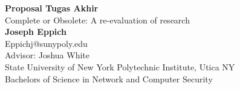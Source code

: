 \documentclass{article}
\begin{document}
	\begin{center}
    
    
		\LARGE{\textbf{Proposal Tugas Akhir}} \\
        \vspace{1em}
        \Large{Complete or Obsolete: A re-evaluation of research} \\
        \vspace{1em}
        \normalsize\textbf{Joseph Eppich} \\
        \normalsize{Eppichj@sunypoly.edu} \\
        \vspace{1em}
        \normalsize{Advisor: Joshua White} \\
        \vspace{1em}
        \normalsize{State University of New York Polytechnic Institute, Utica NY} \\
        \normalsize{Bachelors of Science in Network and Computer Security}
     
	\end{center}
\end{document}
